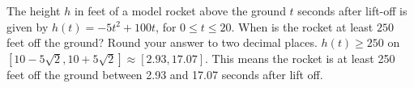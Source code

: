 {The height $h$ in feet of a model rocket above the ground $t$ seconds after lift-off is given by $h(t) = -5t^2+100t$, for $0 \leq t \leq 20$. When is the rocket at least $250$ feet off the ground? Round your answer to two decimal places.}
{$h(t) \geq 250$ on $[10-5\sqrt{2}, 10+5\sqrt{2}] \approx [2.93, 17.07]$.  This means the rocket is at least 250 feet off the ground between 2.93 and 17.07 seconds after lift off. }
